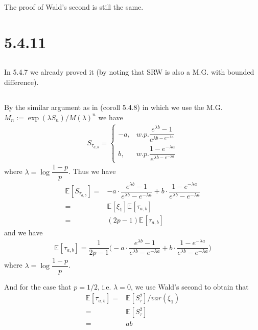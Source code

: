 \documentclass[11pt,a4paper]{ctexart}
\numberwithin{equation}{section}%
\begin{document}
The proof of Wald's second is still the same.

\section{5.4.11}

\subsection{}
In 5.4.7 we already proved it (by noting that SRW is also a M.G. with bounded difference).

\subsection{}

By the similar argument as in (coroll 5.4.8) in which we use the M.G. $ M_n := \exp( \lambda  S_n  )/M(\lambda )^{n} $ we have
\begin{align*}
    S_{\tau_{a,b}}=\begin{cases}
        -a,&w.p. \dfrac{ e^{\lambda b } -1 }{ e^{\lambda b - e^{-\lambda a}} } \\
        b,&w.p. \dfrac{ 1-e^{-\lambda a}  }{ e^{\lambda b - e^{-\lambda a}} }
    \end{cases} 
\end{align*}
where $ \lambda = \log\dfrac{ 1-p }{ p } $. Thus we have
\begin{align*}
    \mathbb{E}_{  }\left[ S_{\tau_{a,b}} \right]  =& -a\cdot \dfrac{ e^{\lambda b } -1 }{ e^{\lambda b }- e^{-\lambda a} } + b\cdot \dfrac{ 1- e^{-\lambda a}  }{ e^{\lambda b }- e^{-\lambda a} }\\
    =& \mathbb{E}_{  }\left[\xi _1 \right]\mathbb{E}_{  }\left[ \tau_{a,b} \right]\\
    =&(2p-1)\mathbb{E}_{  }\left[ \tau_{a,b} \right]  
\end{align*}
and we have
\begin{align*}
    \mathbb{E}_{  }\left[ \tau_{a,b} \right] = \dfrac{ 1 }{ 2p-1 }\big(  -a\cdot \dfrac{ e^{\lambda b } -1 }{ e^{\lambda b }- e^{-\lambda a} } + b\cdot \dfrac{ 1- e^{-\lambda a}  }{ e^{\lambda b }- e^{-\lambda a} } \big) 
\end{align*}
where $ \lambda = \log\dfrac{ 1-p }{ p } $.

And for the case that $ p=1/2 $, i.e. $ \lambda = 0 $, we use Wald's second to obtain that
\begin{align*}
    \mathbb{E}_{  }\left[ \tau_{a,b} \right] = &\mathbb{E}_{  }\left[ S_\tau^2 \right] / var(\xi _1)\\
    =& \mathbb{E}_{  }\left[ S_\tau^2 \right] \\
    =& ab 
\end{align*}
\end{document}
